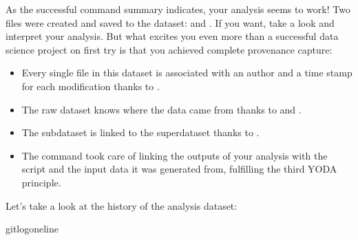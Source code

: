 \sphinxAtStartPar
As the successful command summary indicates, your analysis seems to work! Two
files were created and saved to the dataset: 
and . If you want, take a look and interpret
your analysis. But what excites you even more than a successful data science
project on first try is that you achieved complete provenance capture:
\begin{itemize}
\item {} 
\sphinxAtStartPar
Every single file in this dataset is associated with an author and a time
stamp for each modification thanks to .

\item {} 
\sphinxAtStartPar
The raw dataset knows where the data came from thanks to 
and .

\item {} 
\sphinxAtStartPar
The subdataset is linked to the superdataset thanks to
.

\item {} 
\sphinxAtStartPar
The  command took care of linking the outputs of your
analysis with the script and the input data it was generated from, fulfilling
the third YODA principle.

\end{itemize}

\sphinxAtStartPar
Let’s take a look at the history of the  analysis
dataset:

\begin{sphinxVerbatim}[commandchars=\\\{\}]
gitlog\PYGZhy{}\PYGZhy{}oneline
\end{sphinxVerbatim}

